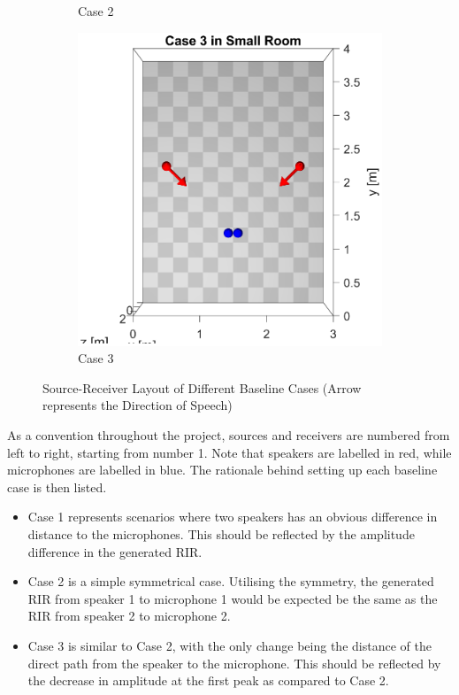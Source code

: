 \documentclass[a4paper,twoside,12pt,hidelinks]{article}
\begin{document}
\begin{figure}[H]
\begin{subfigure}[H]{0.32\textwidth}
\caption{Case 2}
\end{subfigure}
\begin{subfigure}[H]{0.32\textwidth}
\includegraphics[width=\textwidth]{3s_lo}
\caption{Case 3}
\end{subfigure}
\caption{Source-Receiver Layout of Different Baseline Cases (Arrow represents the Direction of Speech)}
\label{fig:testcases}
\end{figure}
As a convention throughout the project, sources and receivers are numbered from left to right, starting from number 1. Note that speakers are labelled in red, while microphones are labelled in blue. The rationale behind setting up each baseline case is then listed.
\begin{itemize}
\item Case 1 represents scenarios where two speakers has an obvious difference in distance to the microphones. This should be reflected by the amplitude difference in the generated RIR.
\item Case 2 is a simple symmetrical case. Utilising the symmetry, the generated RIR from speaker 1 to microphone 1 would be expected be the same as the RIR from speaker 2 to microphone 2.
\item Case 3 is similar to Case 2, with the only change being the distance of the direct path from the speaker to the microphone. This should be reflected by the decrease in amplitude at the first peak as compared to Case 2.
\end{itemize}
\end{document}
